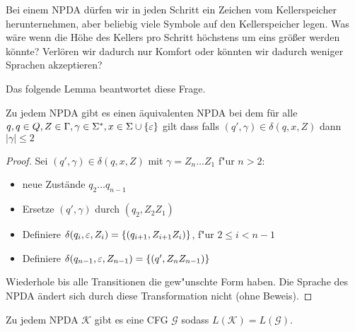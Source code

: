 Bei einem \ac{NPDA} dürfen wir in jeden Schritt ein Zeichen vom Kellerspeicher herunternehmen,
aber beliebig viele Symbole auf den Kellerspeicher legen.
Was wäre wenn die Höhe des Kellers pro Schritt höchstens um eins größer werden könnte?
Verlören wir dadurch nur Komfort oder könnten wir dadurch weniger Sprachen akzeptieren?

Das folgende Lemma beantwortet diese Frage.
\begin{lemma}\label{lem:4.limitStackIncrease}
        Zu jedem \ac{NPDA} gibt es einen äquivalenten \ac{NPDA} bei dem
        für alle $q,q\in Q, Z\in\Gamma, \gamma\in\Sigma^*, x\in\Sigma\cup\{\varepsilon\}$
        gilt dass falls $(q',\gamma)\in\delta(q,x,Z)$ dann $|\gamma| \le 2$
\end{lemma}
\begin{proof}
        Sei $(q',\gamma)\in\delta(q,x,Z)$ mit $\gamma = Z_n\dots Z_1$ f"ur $n>2$:
        \begin{itemize}
        \item   neue Zustände $q_2\dots q_{n-1}$
        \item Ersetze $(q',\gamma)$ durch $(q_2, Z_2Z_1)$
        \item Definiere $\delta(q_i, \varepsilon, Z_i) = \{ (q_{i+1}, Z_{i+1}Z_i) \}$, f"ur $2\le i < n-1$
        \item Definiere $\delta(q_{n-1}, \varepsilon, Z_{n-1}) = \{ (q', Z_nZ_{n-1}) \}$
        \end{itemize}
        Wiederhole bis alle Transitionen die gew"unschte Form haben. 
        Die Sprache des \ac{NPDA} ändert sich durch diese Transformation nicht (ohne Beweis).\qedhere
\end{proof}


\begin{lemma}\label{lem:4.npdaToCfg}
 Zu jedem NPDA $\mathcal{K}$ gibt es eine CFG $\mathcal{G}$  sodass $L(\mathcal{K})=L(\mathcal{G})$.
\end{lemma}

